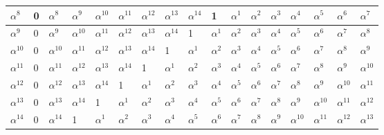 \begin{table}[h!]
\begin{tabular}{|l|l|l|l|l|l|l|l|l|l|l|l|l|l|l|l|l|}
    \hline
    $\alpha^8$ & 0 & $\alpha^8$ & $\alpha^9$ & $\alpha^{10}$ & $\alpha^{11}$ & $\alpha^{12}$ & $\alpha^{13}$ & $\alpha^{14}$ & 1 & $\alpha^1$ & $\alpha^2$ & $\alpha^3$ & $\alpha^4$ & $\alpha^5$ & $\alpha^6$ & $\alpha^7$ \\
    \hline
    $\alpha^{9}$ & 0 & $\alpha^9$ & $\alpha^{10}$ & $\alpha^{11}$ & $\alpha^{12}$ & $\alpha^{13}$ & $\alpha^{14}$ & 1 & $\alpha^1$ & $\alpha^2$ & $\alpha^3$ & $\alpha^4$ & $\alpha^5$ & $\alpha^6$ & $\alpha^7$ & $\alpha^8$ \\
    \hline
    $\alpha^{10}$ & 0 & $\alpha^{10}$ & $\alpha^{11}$ & $\alpha^{12}$ & $\alpha^{13}$ & $\alpha^{14}$ & 1 & $\alpha^1$ & $\alpha^2$ & $\alpha^3$ & $\alpha^4$ & $\alpha^5$ & $\alpha^6$ & $\alpha^7$ & $\alpha^8$ & $\alpha^9$ \\
    \hline
    $\alpha^{11}$ & 0 & $\alpha^{11}$ & $\alpha^{12}$ & $\alpha^{13}$ & $\alpha^{14}$ & 1 & $\alpha^1$ & $\alpha^2$ & $\alpha^3$ & $\alpha^4$ & $\alpha^5$ & $\alpha^6$ & $\alpha^7$ & $\alpha^8$ & $\alpha^9$ & $\alpha^{10}$ \\
    \hline
    $\alpha^{12}$ & 0 & $\alpha^{12}$ & $\alpha^{13}$ & $\alpha^{14}$ & 1 & $\alpha^1$ & $\alpha^2$ & $\alpha^3$ & $\alpha^4$ & $\alpha^5$ & $\alpha^6$ & $\alpha^7$ & $\alpha^8$ & $\alpha^9$ & $\alpha^{10}$ & $\alpha^{11}$ \\
    \hline
    $\alpha^{13}$ & 0 & $\alpha^{13}$ & $\alpha^{14}$ & 1 & $\alpha^1$ & $\alpha^2$ & $\alpha^3$ & $\alpha^4$ & $\alpha^5$ & $\alpha^6$ & $\alpha^7$ & $\alpha^8$ & $\alpha^9$ & $\alpha^{10}$ & $\alpha^{11}$ & $\alpha^{12}$ \\
    \hline
    $\alpha^{14}$ & 0 & $\alpha^{14}$ & 1 & $\alpha^1$ & $\alpha^2$ & $\alpha^3$ & $\alpha^4$ & $\alpha^5$ & $\alpha^6$ & $\alpha^7$ & $\alpha^8$ & $\alpha^9$ & $\alpha^{10}$ & $\alpha^{11}$ & $\alpha^{12}$ & $\alpha^{13}$ \\
    \hline
  \end{tabular}
\end{table}
\normalsize